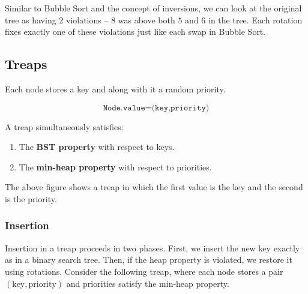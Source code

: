 Similar to Bubble Sort and the concept of inversions, we can look at the original tree as having $2$ 
violations -- $8$ was above both $5$ and $6$ in the tree. Each rotation fixes exactly one of these 
violations just like each swap in Bubble Sort.

\subsection{Treaps}

Each node stores a key and along with it a random priority. 

\[
\texttt{Node.value=(key,priority)}
\]


A treap simultaneously satisfies:
\begin{enumerate}
\item The \textbf{BST property} with respect to keys.
\item The \textbf{min-heap property} with respect to priorities.
\end{enumerate}


\begin{center}
\end{center}

The above figure shows a treap in which the first value is the key and the second is the priority.

\subsubsection*{Insertion}

Insertion in a treap proceeds in two phases. First, we insert the new key exactly as in a 
binary search tree. Then, if the heap property is violated, we restore it using rotations. Consider the 
following treap, where each node stores a pair $(\text{key},\text{priority})$ and priorities 
satisfy the min-heap property.

\begin{center}
\end{center}

